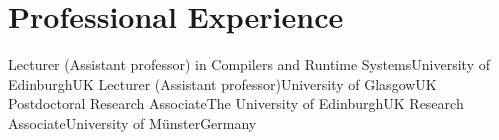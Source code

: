 \section{Professional Experience}
        {Lecturer ({\small Assistant professor}) in Compilers and Runtime Systems}{University of Edinburgh}{UK}{}{}
        {Lecturer ({\small Assistant professor})}{University of Glasgow}{UK}{}{}
        {Postdoctoral Research Associate}{The University of Edinburgh}{UK}{}{}
        {Research Associate}{University of Münster}{Germany}{}{}

